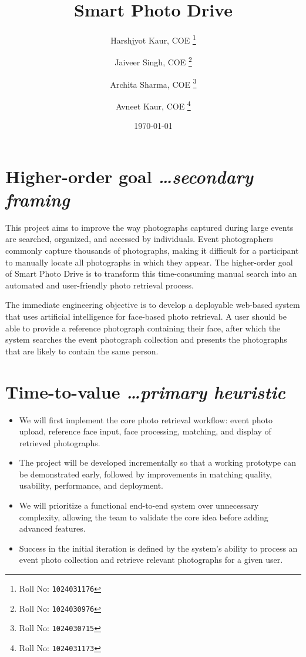 \documentclass[11pt,a4paper]{article}
\title{Smart Photo Drive}
\author{
  Harshjyot Kaur, COE%
  \thanks{Roll No: \texttt{1024031176}}
  \and
  Jaiveer Singh, COE%
  \thanks{Roll No: \texttt{1024030976}}
  \and
  Archita Sharma, COE%
  \thanks{Roll No: \texttt{1024030715}}
  \and
  Avneet Kaur, COE%
  \thanks{Roll No: \texttt{1024031173}}
}
\date{\today}
\newcommand{\BvrHint}[1]{%
  {\normalfont\normalsize\itshape\hfill #1}}
\begin{document}
\maketitle

\section{Higher-order goal%
  \BvrHint{\ldots secondary framing}}

This project aims to improve the way photographs captured during large
events are searched, organized, and accessed by individuals. Event
photographers commonly capture thousands of photographs, making it
difficult for a participant to manually locate all photographs in which
they appear. The higher-order goal of Smart Photo Drive is to transform
this time-consuming manual search into an automated and user-friendly
photo retrieval process.

The immediate engineering objective is to develop a deployable web-based
system that uses artificial intelligence for face-based photo retrieval.
A user should be able to provide a reference photograph containing their
face, after which the system searches the event photograph collection
and presents the photographs that are likely to contain the same person.

\section{Time-to-value %
  \BvrHint{\ldots primary heuristic}}

\begin{itemize}[leftmargin=0.7cm]
    \item We will first implement the core photo retrieval workflow:
    event photo upload, reference face input, face processing, matching,
    and display of retrieved photographs.

    \item The project will be developed incrementally so that a working
    prototype can be demonstrated early, followed by improvements in
    matching quality, usability, performance, and deployment.

    \item We will prioritize a functional end-to-end system over
    unnecessary complexity, allowing the team to validate the core idea
    before adding advanced features.

    \item Success in the initial iteration is defined by the system's
    ability to process an event photo collection and retrieve relevant
    photographs for a given user.
\end{itemize}
\end{document}
